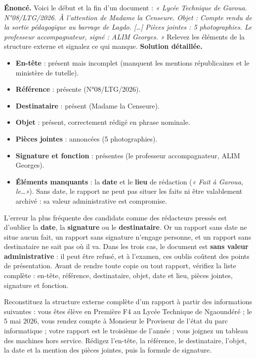 \documentclass[11pt]{article}
\begin{document}
\begin{exoresolu}
\textbf{Énoncé.} Voici le début et la fin d'un document : \emph{« Lycée Technique de Garoua. N°08/LTG/2026. À l'attention de Madame la Censeure. Objet : Compte rendu de la sortie pédagogique au barrage de Lagdo. [\ldots] Pièces jointes : 5 photographies. Le professeur accompagnateur, signé : ALIM Georges. »} Relevez les éléments de la structure externe et signalez ce qui manque.
\tcblower
\textbf{Solution détaillée.}
\begin{itemize}
\item \textbf{En-tête} : présent mais incomplet (manquent les mentions républicaines et le ministère de tutelle).
\item \textbf{Référence} : présente (N°08/LTG/2026).
\item \textbf{Destinataire} : présent (Madame la Censeure).
\item \textbf{Objet} : présent, correctement rédigé en phrase nominale.
\item \textbf{Pièces jointes} : annoncées (5 photographies).
\item \textbf{Signature et fonction} : présentes (le professeur accompagnateur, ALIM Georges).
\item \textbf{Éléments manquants} : la \textbf{date} et le \textbf{lieu} de rédaction (\emph{« Fait à Garoua, le\ldots »}). Sans date, le rapport ne peut pas situer les faits ni être valablement archivé : sa valeur administrative est compromise.
\end{itemize}
\end{exoresolu}

\begin{attention}
L'erreur la plus fréquente des candidats comme des rédacteurs pressés est d'oublier la \textbf{date}, la \textbf{signature} ou le \textbf{destinataire}. Or un rapport sans date ne situe aucun fait, un rapport sans signature n'engage personne, et un rapport sans destinataire ne sait pas où il va. Dans les trois cas, le document est \textbf{sans valeur administrative} : il peut être refusé, et à l'examen, ces oublis coûtent des points de présentation. Avant de rendre toute copie ou tout rapport, vérifiez la liste complète : en-tête, référence, destinataire, objet, date et lieu, pièces jointes, signature et fonction.
\end{attention}

\begin{exercice}
Reconstituez la structure externe complète d'un rapport à partir des informations suivantes : vous êtes élève en Première F4 au Lycée Technique de Ngaoundéré ; le 5 mai 2026, vous rendez compte à Monsieur le Proviseur de l'état du parc informatique ; votre rapport est le troisième de l'année ; vous joignez un tableau des machines hors service. Rédigez l'en-tête, la référence, le destinataire, l'objet, la date et la mention des pièces jointes, puis la formule de signature.
\end{exercice}
\end{document}
